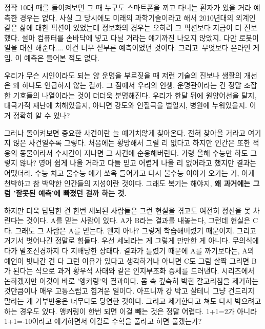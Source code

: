 정작 10대 때를 돌이켜보면 그 때 누구도 스마트폰을 끼고 다니는 환자가 있을 거라 예측한 경우는 없다.
사실 그 당시에도 미래의 과학기술이라고 해서 2010년대의 외계인 같은 삶에 대한 픽션이 있었는데
정보화의 경우는 오히려 그 픽션보다 지금이 더 진보했다. 설마 컴퓨터를 손바닥에 넣고 다닐 거라는 얘기까진 나오지 않았지.
다만 로봇이 일을 대신 해준다.... 이건 너무 섣부른 예측이었던 것이다.
그리고 무엇보다 온라인 게임. 이 예측은 들어본 적도 없다.
\vspace{5mm}

우리가 무슨 시인이라도 되는 양 운명을 부르짖을 때 저런 기술의 진보나 생활의 개선은 왜 하나도 언급하지 않는 걸까.
그 점에서 우리의 인생, 운명관이라는 건 정말 조잡한 기호들의 나열이라는 것이 더더욱 분명해진다.
우리가 한달 뒤에 원양어선을 탈지, 대국가적 재난에 처해있을지, 아니면 강도와 인질극을 벌일지, 병원에 누워있을지.
이거 정확히 알 수 있나?
\vspace{5mm}

그러나 돌이켜보면 중요한 사건이란 늘 예기치않게 찾아온다.
전혀 찾아올 거라고 여기지 않은 사건일수록 그렇다.
처음에는 황망해서 그럴 리 없다고 하지만 인간은 또한 적응의 동물이라서 수시간이 지나면 그 사건에 순응해버린다.
가령 올해 수능만 하도 그렇지 않나? 영어 쉽게 나올 거라고 다들 믿고 어렵게 나올 리 없어라고 했지만 결과는 어땠더라.
수능 치고 물수능 얘기 쏘옥 들어가고 다시 불수능 이야기 오가는 거, 이게 천박하고 참 박약한 인간들의 지성이란 것이다.
그래도 복기는 해야지, \textbf{왜 과거에는 그럼 '잘못된 예측'에 빠졌던 걸까 하는 것.}
\vspace{5mm}

하지만 더욱 답답한 건 한번 세뇌된 사람들은 그런 현실을 겪고도 여전히 정신을 못 차린다는 것이다.
A를 믿는 사람이 있다. A가 B라는 결과를 내놓는다, 그런데 현실은 C다. 그래도 그 사람은 A를 믿는다.
왠지 아나? 그렇게 학습해버렸기 때문이지. 그리고 거기서 벗어나긴 정말로 힘들다.
우선 세뇌라는 게 그렇게 만만한 게 아니다. 무의식에다가 말초신경까지 다 지배당한 상태다.
결과가 틀렸기 때문에 A를 까기보다는, A의 예언이 빗나간 건 다 그런 이유가 있다고 생각하거나
아니면 C도 그림 살짝 그리면 B가 된다는 식으로 과거 황우석 사태와 같은 인지부조화 증세를 드러낸다.
시리즈에서 논하겠지만 이것이 바로 '앵커링'의 결과이다.
몸 속 깊숙히 박힌 갈고리침을 제거하는 것만큼이나 매우 고통스럽고 힘겨운 일이다.
아프니까 걍 박고 살테니 그냥 건드리지 말라는 게 거부반응은 너무다도 당연한 것이다.
그리고 제거한다고 쳐도 다시 박으려고 하는 경우도 있다. 앵커링이 한번 되면 이걸 빼는 것은 정말 어렵다.
1+1=2가 아니라 1+1=-10이라고 얘기하면서 이걸로 수학을 풀라고 하면 풀겠는가?
\vspace{5mm}

